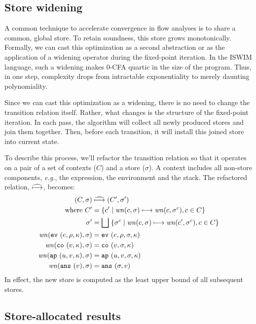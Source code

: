 \documentclass[preprint,onecolumn,9pt]{sigplanconf} %
\begin{document}
\subsection{Store widening}
\label{sec:storewiden}

A common technique to accelerate convergence in flow analyses is to share a
common, global store.
%
To retain soundness, this store grows monotonically.
%
Formally, we can cast this optimization as a second abstraction or as the
application of a widening operator during the fixed-point iteration.
%
In the ISWIM language, such a widening makes 0-CFA quartic in the size of the
program.
%
Thus, in one step, complexity drops from intractable exponentiality to merely
daunting polynomiality.

Since we can cast this optimization as a widening, there is no need to change
the transition relation itself.
%
Rather, what changes is the structure of the fixed-point iteration.
%
In each pass, the algorithm will collect all newly produced stores and join
them together.
%
Then, before each transition, it will install this joined store into current
state.

To describe this process, we'll refactor the transition relation so that it operates on
a pair of a set of contexts ($C$) and a store ($\sigma$).
%
A context includes all non-store components, \emph{e.g.}, the expression, the environment and the stack.
%
The refactored relation, $\widehat{\longmapsto}$, becomes:
%
\begin{align*}
(C, \sigma) &\mathrel{\widehat{\longmapsto}} (C', \sigma') \\
\mbox{where } C' &= \{c' \mid \mathit{wn}(c, \sigma) \mathrel{\longmapsto} \mathit{wn}(c, \sigma^c), c \in C\} \\
              \sigma' &= \bigsqcup\; \{\sigma^c \mid \mathit{wn}(c,\sigma)\mathrel{\longmapsto} \mathit{wn}(c', \sigma^c), c \in C\} \\
\mathit{wn}({\tt ev{\ }}({e, \rho, \kappa}), \sigma) &= {\tt ev{\ }}({e, \rho, \sigma, \kappa}) \\
\mathit{wn}({\tt co{\ }}({v, \kappa}), \sigma) &= {\tt co{\ }}({v, \sigma, \kappa}) \\
\mathit{wn}({\tt ap{\ }}({u, v, \kappa}), \sigma) &= {\tt ap{\ }}({u, v, \sigma, \kappa}) \\
\mathit{wn}({\tt ans{\ }}({v}), \sigma) &= {\tt ans{\ }}({\sigma, v})
\end{align*}
%
In effect, the new store is computed as the least upper bound of all subsequent stores.


\subsection{Store-allocated results}
\label{sec:baselineeval}
\end{document}
